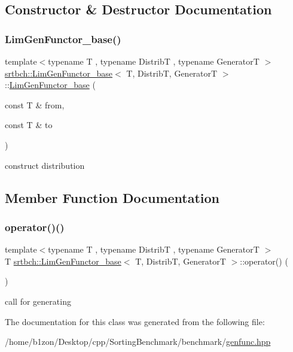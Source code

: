 \subsection{Constructor \& Destructor Documentation}
\mbox{\label{classsrtbch_1_1LimGenFunctor__base_a3f85c4e7af07d138d50af3d97a61912d}} 
\subsubsection{\texorpdfstring{Lim\+Gen\+Functor\+\_\+base()}{LimGenFunctor\_base()}}
{\footnotesize\ttfamily template$<$typename T , typename DistribT , typename GeneratorT $>$ \\
\hyperlink{classsrtbch_1_1LimGenFunctor__base}{srtbch\+::\+Lim\+Gen\+Functor\+\_\+base}$<$ T, DistribT, GeneratorT $>$\+::\hyperlink{classsrtbch_1_1LimGenFunctor__base}{Lim\+Gen\+Functor\+\_\+base} (\begin{DoxyParamCaption}\item[{const T \&}]{from,  }\item[{const T \&}]{to }\end{DoxyParamCaption})\hspace{0.3cm}{\ttfamily [inline]}}

construct distribution 

\subsection{Member Function Documentation}
\mbox{\label{classsrtbch_1_1LimGenFunctor__base_a242d32ca0a61b11420916c247ee625c9}} 
\subsubsection{\texorpdfstring{operator()()}{operator()()}}
{\footnotesize\ttfamily template$<$typename T , typename DistribT , typename GeneratorT $>$ \\
T \hyperlink{classsrtbch_1_1LimGenFunctor__base}{srtbch\+::\+Lim\+Gen\+Functor\+\_\+base}$<$ T, DistribT, GeneratorT $>$\+::operator() (\begin{DoxyParamCaption}{ }\end{DoxyParamCaption})\hspace{0.3cm}{\ttfamily [inline]}}

call for generating 

The documentation for this class was generated from the following file\+:\begin{DoxyCompactItemize}
\item 
/home/b1zon/\+Desktop/cpp/\+Sorting\+Benchmark/benchmark/\hyperlink{genfunc_8hpp}{genfunc.\+hpp}\end{DoxyCompactItemize}
